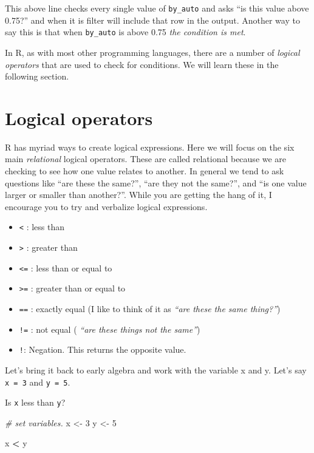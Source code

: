 \documentclass[
]{book}
\newenvironment{Shaded}{\begin{snugshade}}{\end{snugshade}}
\newcommand{\CommentTok}[1]{\textcolor[rgb]{0.56,0.35,0.01}{\textit{#1}}}
\newcommand{\DecValTok}[1]{\textcolor[rgb]{0.00,0.00,0.81}{#1}}
\newcommand{\NormalTok}[1]{#1}
\newcommand{\OperatorTok}[1]{\textcolor[rgb]{0.81,0.36,0.00}{\textbf{#1}}}
\newcommand{\StringTok}[1]{\textcolor[rgb]{0.31,0.60,0.02}{#1}}
\providecommand{\tightlist}{%
  \setlength{\itemsep}{0pt}\setlength{\parskip}{0pt}}
\begin{document}
This above line checks every single value of \texttt{by\_auto} and asks ``is this value above 0.75?'' and when it is filter will include that row in the output. Another way to say this is that when \texttt{by\_auto} is above 0.75 \emph{the condition is met}.

In R, as with most other programming languages, there are a number of \emph{logical operators} that are used to check for conditions. We will learn these in the following section.

\hypertarget{logical-operators}{%
\section{Logical operators}\label{logical-operators}}

R has myriad ways to create logical expressions. Here we will focus on the six main \emph{relational} logical operators. These are called relational because we are checking to see how one value relates to another. In general we tend to ask questions like ``are these the same?'', ``are they not the same?'', and ``is one value larger or smaller than another?''. While you are getting the hang of it, I encourage you to try and verbalize logical expressions.

\begin{itemize}
\tightlist
\item
  \texttt{\textless{}} : less than
\item
  \texttt{\textgreater{}} : greater than
\item
  \texttt{\textless{}=} : less than or equal to
\item
  \texttt{\textgreater{}=} : greater than or equal to
\item
  \texttt{==} : exactly equal (I like to think of it as \emph{``are these the same thing?''})
\item
  \texttt{!=} : not equal ( \emph{``are these things not the same''})
\item
  \texttt{!}: Negation. This returns the opposite value.
\end{itemize}

Let's bring it back to early algebra and work with the variable x and y. Let's say \texttt{x\ =\ 3} and \texttt{y\ =\ 5}.

Is \texttt{x} less than \texttt{y}?

\begin{Shaded}
\begin{Highlighting}[]
\CommentTok{\# set variables.}
\NormalTok{x \textless{}{-}}\StringTok{ }\DecValTok{3}
\NormalTok{y \textless{}{-}}\StringTok{ }\DecValTok{5}

\NormalTok{x }\OperatorTok{\textless{}}\StringTok{ }\NormalTok{y}
\end{Highlighting}
\end{Shaded}
\end{document}
